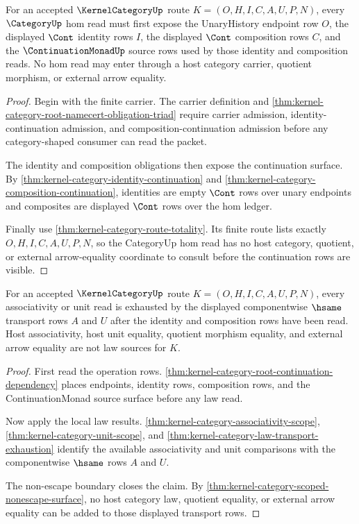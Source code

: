 \begin{theorem}
\label{thm:kernel-category-root-continuation-dependency}
For an accepted $\KernelCategoryUp$ route $K=(O,H,I,C,A,U,P,N)$, every $\CategoryUp$ hom read must first expose the UnaryHistory endpoint row $O$, the displayed $\Cont$ identity rows $I$, the displayed $\Cont$ composition rows $C$, and the $\ContinuationMonadUp$ source rows used by those identity and composition reads. No hom read may enter through a host category carrier, quotient morphism, or external arrow equality.
\end{theorem}
\begin{proof}
Begin with the finite carrier. The carrier definition and \autoref{thm:kernel-category-root-namecert-obligation-triad} require carrier admission, identity-continuation admission, and composition-continuation admission before any category-shaped consumer can read the packet.

The identity and composition obligations then expose the continuation surface. By \autoref{thm:kernel-category-identity-continuation} and \autoref{thm:kernel-category-composition-continuation}, identities are empty $\Cont$ rows over unary endpoints and composites are displayed $\Cont$ rows over the hom ledger.

Finally use \autoref{thm:kernel-category-route-totality}. Its finite route lists exactly $O,H,I,C,A,U,P,N$, so the CategoryUp hom read has no host category, quotient, or external arrow-equality coordinate to consult before the continuation rows are visible.
\end{proof}

\begin{theorem}
\label{thm:kernel-category-root-law-dependency}
For an accepted $\KernelCategoryUp$ route $K=(O,H,I,C,A,U,P,N)$, every associativity or unit read is exhausted by the displayed componentwise $\hsame$ transport rows $A$ and $U$ after the identity and composition rows have been read. Host associativity, host unit equality, quotient morphism equality, and external arrow equality are not law sources for $K$.
\end{theorem}
\begin{proof}
First read the operation rows. \autoref{thm:kernel-category-root-continuation-dependency} places endpoints, identity rows, composition rows, and the ContinuationMonad source surface before any law read.

Now apply the local law results. \autoref{thm:kernel-category-associativity-scope}, \autoref{thm:kernel-category-unit-scope}, and \autoref{thm:kernel-category-law-transport-exhaustion} identify the available associativity and unit comparisons with the componentwise $\hsame$ rows $A$ and $U$.

The non-escape boundary closes the claim. By \autoref{thm:kernel-category-scoped-nonescape-surface}, no host category law, quotient equality, or external arrow equality can be added to those displayed transport rows.
\end{proof}

